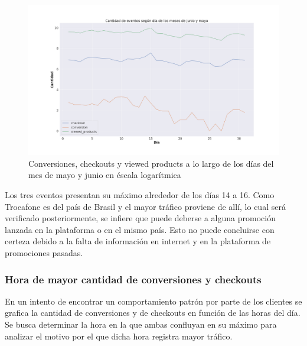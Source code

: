 \documentclass[a4paper]{article}
\begin{document}
\begin{figure}[h!]
	\includegraphics[width=\linewidth]{figures/033-eventos_mayo_junio_lineplot.png}
	\caption{Conversiones, checkouts y viewed products a lo largo de los días del mes de mayo y junio en éscala logarítmica}
	\label{mayojunio}
\end{figure}

Los tres eventos presentan su máximo alrededor de los días 14 a 16. Como Trocafone es del país de Brasil y el mayor tráfico proviene de allí, lo cual será verificado posteriormente, se infiere que puede deberse a alguna promoción lanzada en la plataforma o en el mismo país. Esto no puede concluirse con certeza debido a la falta de información en internet y en la plataforma de promociones pasadas.

\subsubsection{Hora de mayor cantidad de conversiones y checkouts}

En un intento de encontrar un comportamiento patrón por parte de los clientes se grafica la cantidad de conversiones y de checkouts en función de las horas del día. Se busca determinar la hora en la que ambas confluyan en su máximo para analizar el motivo por el que dicha hora registra mayor tráfico.
\end{document}
